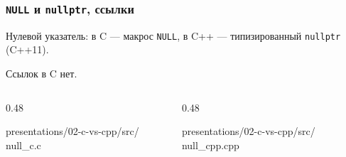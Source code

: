 \documentclass[compress, 8pt, aspectratio=169]{beamer}
\begin{document}
\begin{frame}[fragile]

    \frametitle{\texttt{NULL} и \texttt{nullptr}, ссылки}

    \begin{myitemize}

        \item Нулевой указатель: в C --- макрос \texttt{NULL},
        в C++ --- типизированный \texttt{nullptr} (C++11).

        \item Ссылок в C нет.

    \end{myitemize}

    \begin{columns}[T]

        \begin{column}{0.48\textwidth}

                {presentations/02-c-vs-cpp/src/}
                {null_c.c}

        \end{column}

        \begin{column}{0.48\textwidth}

                {presentations/02-c-vs-cpp/src/}
                {null_cpp.cpp}

        \end{column}

    \end{columns}

\end{frame}
\end{document}
